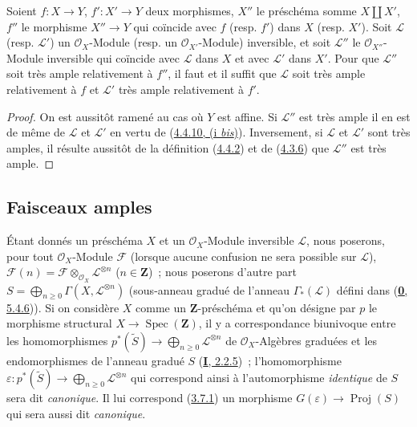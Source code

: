 \begin{proposition}[4.4.11]
\label{II.4.4.11-fr}
Soient $f:X\to Y$, $f':X'\to Y$ deux morphismes, $X''$ le préschéma somme
$X\amalg X'$, $f''$ le morphisme $X''\to Y$ qui coïncide avec $f$ \textup{(resp.
$f'$)} dans $X$ \textup{(resp. $X'$)}. Soit $\mathcal{L}$ \textup{(resp. $\mathcal{L}'$)} un
$\mathcal{O}_X$-Module \textup{(resp.} un $\mathcal{O}_{X'}$-Module\textup{)} inversible, et
soit $\mathcal{L}''$ le $\mathcal{O}_{X''}$-Module inversible qui coïncide
avec $\mathcal{L}$ dans $X$ et avec $\mathcal{L}'$ dans $X'$. Pour que
$\mathcal{L}''$ soit très ample relativement à $f''$, il faut et il suffit
que $\mathcal{L}$ soit très ample relativement à $f$ et $\mathcal{L}'$ très
ample relativement à $f'$.
\end{proposition}

\begin{proof}
On est aussitôt ramené au cas où $Y$ est affine. Si $\mathcal{L}''$ est très
ample il en est de même de $\mathcal{L}$ et $\mathcal{L}'$ en vertu de
(\hyperref[II.4.4.10-fr]{4.4.10, (i \emph{bis})}). Inversement, si $\mathcal{L}$ et
$\mathcal{L}'$ sont très amples, il résulte aussitôt de la définition
(\hyperref[II.4.4.2-fr]{4.4.2}) et de
(\hyperref[II.4.3.6-fr]{4.3.6}) que $\mathcal{L}''$ est très ample.
\end{proof}

\subsection{Faisceaux amples}
\label{subsection:II.4.5-fr}

\begin{env}[4.5.1]
\label{II.4.5.1-fr}
Étant donnés un préschéma $X$ et un $\mathcal{O}_X$-Module inversible
$\mathcal{L}$, nous poserons, pour tout $\mathcal{O}_X$-Module $\mathcal{F}$
(lorsque aucune confusion ne sera possible sur $\mathcal{L}$),
$\mathcal{F}(n)=\mathcal{F}\otimes_{\mathcal{O}_X}\mathcal{L}^{\otimes n}$
($n\in\mathbf{Z}$)~; nous poserons d'autre part
$S=\bigoplus_{n\geq0}\Gamma(X,\mathcal{L}^{\otimes n})$
(sous-anneau gradué de l'anneau $\Gamma_*(\mathcal{L})$ défini dans
(\hyperref[0.5.4.6-fr]{\textbf{0}, 5.4.6})). Si on considère $X$ comme un
$\mathbf{Z}$-préschéma et qu'on désigne par $p$ le morphisme structural
$X\to\operatorname{Spec}(\mathbf{Z})$, il y a correspondance biunivoque
entre les homomorphismes
$p^*(\widetilde{S})\longrightarrow\bigoplus_{n\geq0}\mathcal{L}^{\otimes n}$
de $\mathcal{O}_X$-Algèbres graduées et les endomorphismes de l'anneau gradué
$S$ (\hyperref[I.2.2.5-fr]{\textbf{I}, 2.2.5})~; l'homomorphisme
$\varepsilon:p^*(\widetilde{S})\longrightarrow\bigoplus_{n\geq0}\mathcal{L}^{\otimes n}$
qui correspond ainsi à l'automorphisme \emph{identique} de $S$ sera dit \emph{canonique}.
Il lui correspond (\hyperref[II.3.7.1-fr]{3.7.1}) un morphisme
$G(\varepsilon)\to\operatorname{Proj}(S)$ qui sera aussi dit \emph{canonique}.
\end{env}

